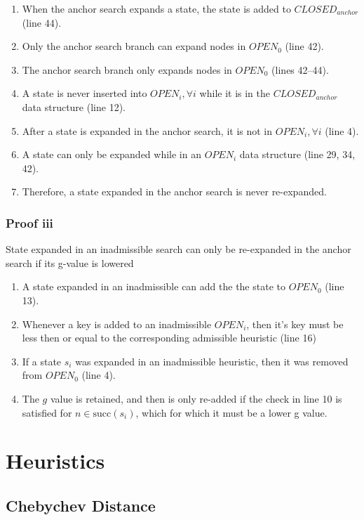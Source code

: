 \documentclass[11pt,draft]{article}
\begin{document}
\begin{enumerate}
    \item When the anchor search expands a state, the state is added to $CLOSED_{anchor}$ (line 44).
    \item Only the anchor search branch can expand nodes in $OPEN_0$ (line 42).
    \item The anchor search branch only expands nodes in $OPEN_0$ (lines 42--44).
    \item A state is never inserted into $OPEN_i, \forall i$ while it is in the $CLOSED_{anchor}$ data structure (line 12).
    \item After a state is expanded in the anchor search, it is not in $OPEN_i, \forall i$ (line 4).
    \item A state can only be expanded while in an $OPEN_i$ data structure (line 29, 34, 42).
    \item Therefore, a state expanded in the anchor search is never re-expanded.
\end{enumerate}

\subsubsection{Proof iii}
State expanded in an inadmissible search can only be re-expanded in the anchor search if its g-value is lowered

\begin{enumerate}
    \item A state expanded in an inadmissible can add the the state to $OPEN_0$ (line 13).
    \item Whenever a key is added to an inadmissible $OPEN_i$, then it's key must be less then or equal to the corresponding admissible heuristic (line 16)
    \item If a state $s_i$ was expanded in an inadmissible heuristic, then it was removed from $OPEN_0$ (line 4).
    \item The $g$ value is retained, and then is only re-added if the check in line 10 is satisfied for $n \in \text{succ}(s_i)$, which for which it must be a lower g value.
\end{enumerate}

\section{Heuristics}

\subsection{Chebychev Distance}
\end{document}
